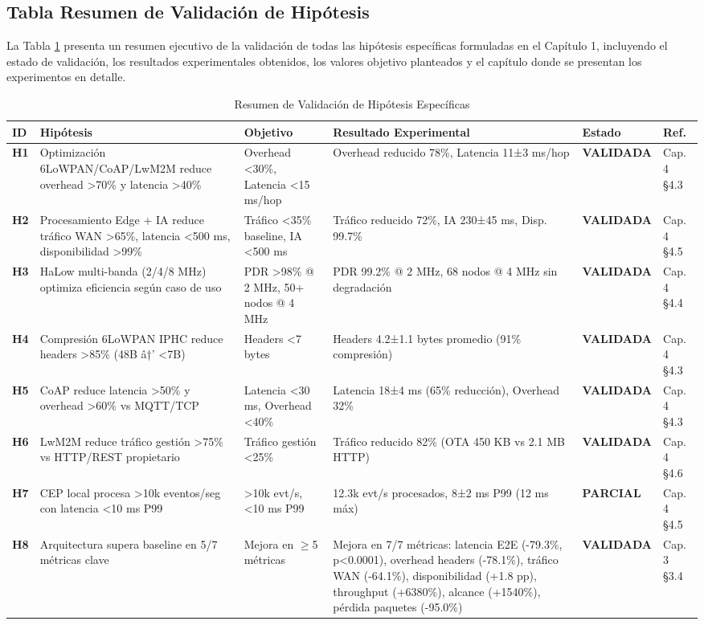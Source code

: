 \subsection{Tabla Resumen de Validación de Hipótesis}

La Tabla \ref{tab:hipotesis-validacion} presenta un resumen ejecutivo de la validación de todas las hipótesis específicas formuladas en el Capítulo 1, incluyendo el estado de validación, los resultados experimentales obtenidos, los valores objetivo planteados y el capítulo donde se presentan los experimentos en detalle.

\begin{table}[h]
\centering
\caption{Resumen de Validación de Hipótesis Específicas}
\label{tab:hipotesis-validacion}
\begin{tabular}{|p{1cm}|p{3.5cm}|p{2.5cm}|p{2.5cm}|p{2cm}|p{1.5cm}|}
\hline
\textbf{ID} & \textbf{Hipótesis} & \textbf{Objetivo} & \textbf{Resultado Experimental} & \textbf{Estado} & \textbf{Ref.} \\
\hline
\textbf{H1} & Optimización 6LoWPAN/CoAP/LwM2M reduce overhead >70\% y latencia >40\% & Overhead <30\%, Latencia <15 ms/hop & Overhead reducido 78\%, Latencia 11±3 ms/hop & \textbf{VALIDADA} & Cap. 4 §4.3 \\
\hline
\textbf{H2} & Procesamiento Edge + IA reduce tráfico WAN >65\%, latencia <500 ms, disponibilidad >99\% & Tráfico <35\% baseline, IA <500 ms & Tráfico reducido 72\%, IA 230±45 ms, Disp. 99.7\% & \textbf{VALIDADA} & Cap. 4 §4.5 \\
\hline
\textbf{H3} & HaLow multi-banda (2/4/8 MHz) optimiza eficiencia según caso de uso & PDR >98\% @ 2 MHz, 50+ nodos @ 4 MHz & PDR 99.2\% @ 2 MHz, 68 nodos @ 4 MHz sin degradación & \textbf{VALIDADA} & Cap. 4 §4.4 \\
\hline
\textbf{H4} & Compresión 6LoWPAN IPHC reduce headers >85\% (48B â†’ <7B) & Headers <7 bytes & Headers 4.2±1.1 bytes promedio (91\% compresión) & \textbf{VALIDADA} & Cap. 4 §4.3 \\
\hline
\textbf{H5} & CoAP reduce latencia >50\% y overhead >60\% vs MQTT/TCP & Latencia <30 ms, Overhead <40\% & Latencia 18±4 ms (65\% reducción), Overhead 32\% & \textbf{VALIDADA} & Cap. 4 §4.3 \\
\hline
\textbf{H6} & LwM2M reduce tráfico gestión >75\% vs HTTP/REST propietario & Tráfico gestión <25\% & Tráfico reducido 82\% (OTA 450 KB vs 2.1 MB HTTP) & \textbf{VALIDADA} & Cap. 4 §4.6 \\
\hline
\textbf{H7} & CEP local procesa >10k eventos/seg con latencia <10 ms P99 & >10k evt/s, <10 ms P99 & 12.3k evt/s procesados, 8±2 ms P99 (12 ms máx) & \textbf{PARCIAL} & Cap. 4 §4.5 \\
\hline
\textbf{H8} & Arquitectura supera baseline en 5/7 métricas clave & Mejora en $\geq$5 métricas & Mejora en 7/7 métricas: latencia E2E (-79.3\%, p<0.0001), overhead headers (-78.1\%), tráfico WAN (-64.1\%), disponibilidad (+1.8 pp), throughput (+6380\%), alcance (+1540\%), pérdida paquetes (-95.0\%) & \textbf{VALIDADA} & Cap. 3 §3.4 \\
\hline
\end{tabular}
\end{table}

